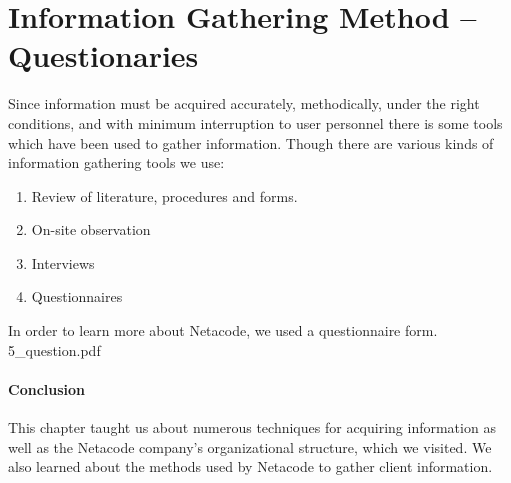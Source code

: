 \documentclass[a4paper,12pt]{report}
\begin{document}
\section{Information Gathering Method – Questionaries}
Since information must be acquired accurately, methodically, under the right conditions, and
with minimum interruption to user personnel there is some tools which have been used to gather
information. Though there are various kinds of information gathering tools we use:\\
\begin{enumerate}
	\item  Review of literature, procedures and forms.
	\item  On-site observation
	\item  Interviews
	\item Questionnaires
\end{enumerate}
In order to learn more about Netacode, we used a questionnaire form.
	 {5_question.pdf}
\paragraph{Conclusion}
This chapter taught us about numerous techniques for acquiring information as well as the Netacode company's organizational structure, which we visited. We also learned about the methods used by Netacode to gather client information.
\end{document}
